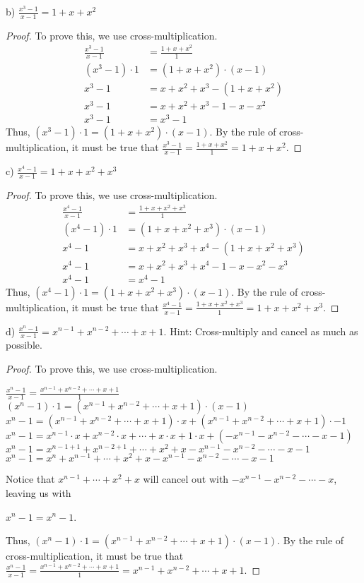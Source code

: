 \documentclass[12pt]{article}
\begin{document}
\noindent b) $\displaystyle \frac{x^3-1}{x-1}=1+x+x^2$
\begin{proof}
To prove this, we use cross-multiplication.
\begin{align*}
\displaystyle \frac{x^3-1}{x-1}&=\displaystyle \frac{1+x+x^2}{1} \\
(x^3-1)\cdot1&=(1+x+x^2)\cdot(x-1) \\
x^3-1&=x+x^2+x^3-(1+x+x^2) \\
x^3-1&=x+x^2+x^3-1-x-x^2 \\
x^3-1&=x^3-1
\end{align*}
Thus, $(x^3-1)\cdot1=(1+x+x^2)\cdot(x-1)$. By the rule of cross-multiplication, it must be true that $\displaystyle \frac{x^3-1}{x-1}=\displaystyle \frac{1+x+x^2}{1}=1+x+x^2$.
\end{proof}
\noindent c) $\displaystyle \frac{x^4-1}{x-1}=1+x+x^2+x^3$
\begin{proof}
To prove this, we use cross-multiplication.
\begin{align*}
\displaystyle \frac{x^4-1}{x-1}&=\displaystyle \frac{1+x+x^2+x^3}{1} \\
(x^4-1)\cdot1&=(1+x+x^2+x^3)\cdot(x-1) \\
x^4-1&=x+x^2+x^3+x^4-(1+x+x^2+x^3) \\
x^4-1&=x+x^2+x^3+x^4-1-x-x^2-x^3 \\
x^4-1&=x^4-1
\end{align*}
Thus, $(x^4-1)\cdot1=(1+x+x^2+x^3)\cdot(x-1)$. By the rule of cross-multiplication, it must be true that $\displaystyle \frac{x^4-1}{x-1}=\displaystyle \frac{1+x+x^2+x^3}{1}=1+x+x^2+x^3$.
\end{proof}
\noindent d) $\displaystyle \frac{x^n-1}{x-1}=x^{n-1}+x^{n-2}+\cdots+x+1.$ Hint: Cross-multiply and cancel as much as possible.
\begin{proof}
To prove this, we use cross-multiplication.
\begin{center}
$\displaystyle \frac{x^n-1}{x-1}=\displaystyle \frac{x^{n-1}+x^{n-2}+\cdots+x+1}{1}$ \\
$(x^n-1)\cdot1=(x^{n-1}+x^{n-2}+\cdots+x+1)\cdot(x-1)$ \\
$x^n-1=(x^{n-1}+x^{n-2}+\cdots+x+1)\cdot x+(x^{n-1}+x^{n-2}+\cdots+x+1)\cdot-1$ \\
$x^n-1=x^{n-1}\cdot x+x^{n-2}\cdot x+\cdots+x\cdot x+1\cdot x+(-x^{n-1}-x^{n-2}-\cdots-x-1)$ \\
$x^n-1=x^{n-1+1}+x^{n-2+1}+\cdots+x^2+x-x^{n-1}-x^{n-2}-\cdots-x-1$ \\
$x^n-1=x^n+x^{n-1}+\cdots+x^2+x-x^{n-1}-x^{n-2}-\cdots-x-1$ \\
\end{center}
Notice that $x^{n-1}+\cdots+x^2+x$ will cancel out with $-x^{n-1}-x^{n-2}-\cdots-x$, leaving us with
\begin{center}
$x^n-1=x^n-1$.
\end{center}
Thus, $(x^n-1)\cdot1=(x^{n-1}+x^{n-2}+\cdots+x+1)\cdot(x-1)$. By the rule of cross-multiplication, it must be true that $\displaystyle \frac{x^n-1}{x-1}=\displaystyle \frac{x^{n-1}+x^{n-2}+\cdots+x+1}{1}=x^{n-1}+x^{n-2}+\cdots+x+1$.
\end{proof}
\end{document}
